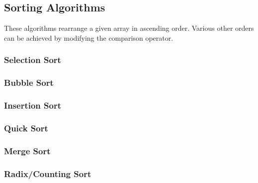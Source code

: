 \documentclass{article}
\begin{document}
\subsection{Sorting Algorithms}
These algorithms rearrange a given array in ascending order. Various other orders can be achieved by modifying the comparison operator.
\subsubsection*{Selection Sort}

\subsubsection*{Bubble Sort}
\subsubsection*{Insertion Sort}
\subsubsection*{Quick Sort}
\subsubsection*{Merge Sort}
\subsubsection*{Radix/Counting Sort}
\end{document}
